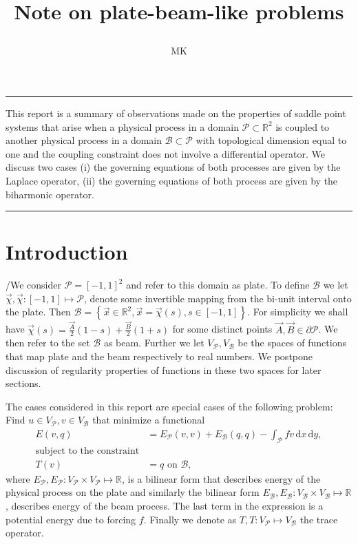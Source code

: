 \documentclass[a4paper,10pt]{article}
\newcommand{\R}{\ensuremath{\mathbb{R}}}
\newcommand{\meas}[1]{\ensuremath{\,\mathrm{d}#1}}
\newcommand{\Vp}{\ensuremath{V_{\mathcal{P}}}}
\newcommand{\Vb}{\ensuremath{V_{\mathcal{B}}}}
\newcommand{\Ep}{\ensuremath{E_{\mathcal{P}}}}
\newcommand{\Eb}{\ensuremath{E_{\mathcal{B}}}}
\renewenvironment{abstract}{%
\hfill\begin{minipage}{0.95\textwidth}
\rule{\textwidth}{1pt}}
{\par\noindent\rule{\textwidth}{1pt}\end{minipage}}
\begin{document}
%
\title{\begin{center}
        Note on plate-beam-like problems
       \end{center}}
\author[1]{MK}
%
\maketitle
%
\begin{abstract}
  This report is a summary of observations made on the properties of saddle
  point systems that arise when a physical process in a domain
  $\mathcal{P}\subset\R^2$ is coupled to another physical process in a domain
  $\mathcal{B}\subset\mathcal{P}$ with topological dimension equal to one and
  the coupling constraint does not involve a differential operator. We discuss
  two cases (i) the governing equations of both processes are given by the
  Laplace operator, (ii) the governing equations of both process are given by
  the biharmonic operator.
\end{abstract}

\section{Introduction}
  /We consider $\mathcal{P}=\left[-1, 1\right]^2$ and refer to this domain as
  plate. To define $\mathcal{B}$ we let
  $\vec{\chi}, \vec{\chi}:\left[-1, 1\right]\mapsto\mathcal{P}$, denote some
  invertible mapping from the bi-unit interval onto the plate. Then
  $\mathcal{B}=\left\{\vec{x}\in\R^2, \vec{x}=\vec{\chi}(s), s\in\left[-1,
  1\right]\right\}$. For simplicity we shall have
  $\vec{\chi}(s)=\frac{\vec{A}}{2}(1-s) +\frac{\vec{B}}{2}(1+s)$ for some
  distinct points $\vec{A}, \vec{B}\in\partial\mathcal{P}$. We then refer to
  the set $\mathcal{B}$ as beam. Further we let $V_{\mathcal{P}}, V_{\mathcal{B}}$
  be the spaces of functions that map plate and the beam respectively to real
  numbers. We postpone discussion of regularity properties of functions in these
  two spaces for later sections.

  The cases considered in this report are special cases of the following
  problem: Find $u\in\Vp, v\in\Vb$ that minimize a functional
  \begin{equation}
    \label{eq:energy}
    \begin{aligned}
      E(v, q) &= \Ep(v, v) + \Eb(q, q) - \int_{\mathcal{P}}f v \meas{x}\meas{y}, \\
      \text{subject to the constraint}&\\
      T(v) &= q\text{ on }\mathcal{B},
    \end{aligned}
  \end{equation}
  where $\Ep, \Ep: \Vp\times\Vp\mapsto\R$, is a bilinear form that describes
  energy of the physical process on the plate and similarly the bilinear form
  $\Eb, \Eb:\Vb\times\Vb\mapsto\R$, describes energy of the beam process. The
  last term in the expression is a potential energy due to forcing $f$. Finally
  we denote as $T, T:\Vp\mapsto\Vb$ the trace operator.
  
\end{document}
